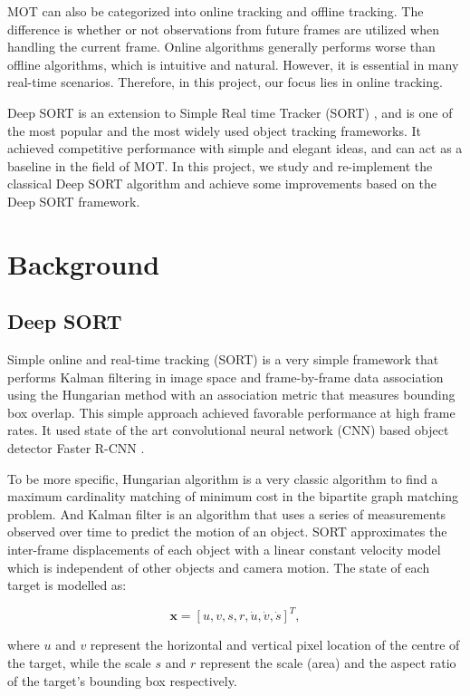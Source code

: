 \documentclass[conference]{IEEEtran}
\begin{document}
MOT can also be categorized into online tracking and offline tracking. The difference is whether or not observations from future frames are utilized when handling the current frame. Online algorithms generally performs worse than offline algorithms, which is intuitive and natural. However, it is essential in many real-time scenarios. Therefore, in this project, our focus lies in online tracking.

Deep SORT \cite{Wojke2017simple} is an extension to Simple Real time Tracker (SORT) \cite{Bewley2016_sort}, and is one of the most popular and the most widely used object tracking frameworks. It achieved competitive performance with simple and elegant ideas, and can act as a baseline in the field of MOT. In this project, we study and re-implement the classical Deep SORT algorithm and achieve some improvements based on the Deep SORT framework.

\section{Background}

\subsection{Deep SORT}

Simple online and real-time tracking (SORT) is a very simple framework that performs Kalman filtering in image space and frame-by-frame data association using the Hungarian method with an association metric that measures bounding box overlap. This simple approach achieved favorable performance at high frame rates. It used state of the art convolutional neural network (CNN) based object detector Faster R-CNN \cite{ren2015faster}.

To be more specific, Hungarian algorithm \cite{kuhn1955hungarian} is a very classic algorithm to find a maximum cardinality matching of minimum cost in the bipartite graph matching problem. And Kalman filter \cite{kalman1960new} is an algorithm that uses a series of measurements observed over time to predict the motion of an object. SORT approximates the inter-frame displacements of each object with a linear constant velocity model which is independent of other objects and camera motion. The state of each target is modelled as:

\[
    \boldsymbol{x} = [u,v,s,r,\dot{u},\dot{v},\dot{s}]^T,
\]

\noindent where $u$ and $v$ represent the horizontal and vertical pixel location of the centre of the target, while the scale $s$ and $r$ represent the scale (area) and the aspect ratio of the target’s bounding box respectively.
\end{document}
